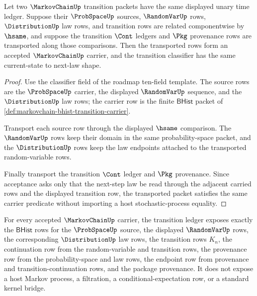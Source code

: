 \begin{theorem}
\label{thm:markovchain-kernel-classifier-stability}
Let two $\MarkovChainUp$ transition packets have the same displayed unary time ledger. Suppose their $\ProbSpaceUp$ sources, $\RandomVarUp$ rows, $\DistributionUp$ law rows, and transition rows are related componentwise by $\hsame$, and suppose the transition $\Cont$ ledgers and $\Pkg$ provenance rows are transported along those comparisons. Then the transported rows form an accepted $\MarkovChainUp$ carrier, and the transition classifier has the same current-state to next-law shape.
\end{theorem}
\begin{proof}
Use the classifier field of the roadmap ten-field template. The source rows are the $\ProbSpaceUp$ carrier, the displayed $\RandomVarUp$ sequence, and the $\DistributionUp$ law rows; the carrier row is the finite $\mathsf{BHist}$ packet of \autoref{def:markovchain-bhist-transition-carrier}.

Transport each source row through the displayed $\hsame$ comparison. The $\RandomVarUp$ rows keep their domain in the same probability-space packet, and the $\DistributionUp$ rows keep the law endpoints attached to the transported random-variable rows.

Finally transport the transition $\Cont$ ledger and $\Pkg$ provenance. Since acceptance asks only that the next-step law be read through the adjacent carried rows and the displayed transition row, the transported packet satisfies the same carrier predicate without importing a host stochastic-process equality.
\end{proof}
\begin{theorem}
\label{thm:markovchain-transition-ledger-exactness}
For every accepted $\MarkovChainUp$ carrier, the transition ledger exposes exactly the $\mathsf{BHist}$ rows for the $\ProbSpaceUp$ source, the displayed $\RandomVarUp$ rows, the corresponding $\DistributionUp$ law rows, the transition rows $K_n$, the continuation row from the random-variable and transition rows, the provenance row from the probability-space and law rows, the endpoint row from provenance and transition-continuation rows, and the package provenance. It does not expose a host Markov process, a filtration, a conditional-expectation row, or a standard kernel bridge.
\end{theorem}
